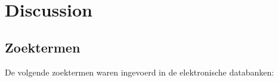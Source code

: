 \documentclass[twoside,twocolumn]{article}
\begin{document}
\blindtext %

\blindtext %



\section{Discussion}

\blindtext %





\clearpage

\appendix

\begin{appendices}
  \section{Zoektermen}
  \label{appendix:keywords}
  De volgende zoektermen waren ingevoerd in de elektronische databanken:

  \blindtext %
\end{appendices}

\end{document}
